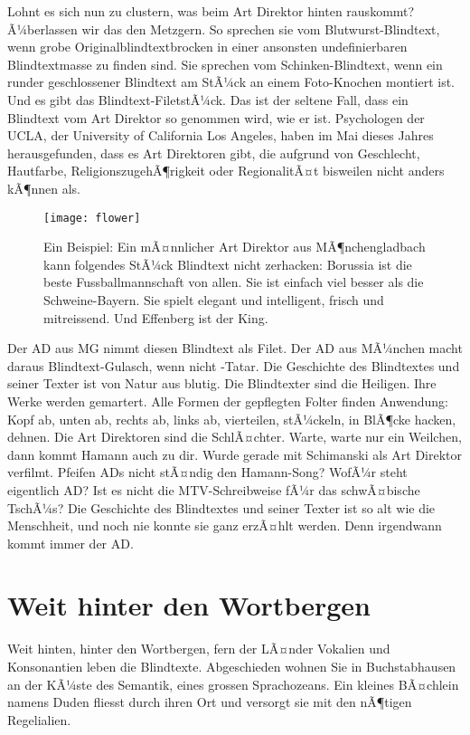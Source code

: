 \documentclass{scrartcl}
\begin{document}
  Lohnt es sich nun zu clustern, was beim Art Direktor hinten rauskommt? Ã¼berlassen wir das den Metzgern. So sprechen sie vom Blutwurst-Blindtext, wenn grobe Originalblindtextbrocken in einer ansonsten undefinierbaren Blindtextmasse zu finden sind. Sie sprechen vom Schinken-Blindtext, wenn ein runder geschlossener Blindtext am StÃ¼ck an einem Foto-Knochen montiert ist. Und es gibt das Blindtext-FiletstÃ¼ck. Das ist der seltene Fall, dass ein Blindtext vom Art Direktor so genommen wird, wie er ist. Psychologen der UCLA, der University of California Los Angeles, haben im Mai dieses Jahres herausgefunden, dass es Art Direktoren gibt, die aufgrund von Geschlecht, Hautfarbe, ReligionszugehÃ¶rigkeit oder RegionalitÃ¤t bisweilen nicht anders kÃ¶nnen als.

  \begin{figure}
    \centering
    \texttt{[image: flower]}
    \caption{Ein Beispiel: Ein mÃ¤nnlicher Art Direktor aus MÃ¶nchengladbach kann folgendes StÃ¼ck Blindtext nicht zerhacken: Borussia ist die beste Fussballmannschaft von allen. Sie ist einfach viel besser als die Schweine-Bayern. Sie spielt elegant und intelligent, frisch und mitreissend. Und Effenberg ist der King.}
    \label{fig:flower}
  \end{figure}

  Der AD aus MG nimmt diesen Blindtext als Filet. Der AD aus MÃ¼nchen macht daraus Blindtext-Gulasch, wenn nicht -Tatar. Die Geschichte des Blindtextes und seiner Texter ist von Natur aus blutig. Die Blindtexter sind die Heiligen. Ihre Werke werden gemartert. Alle Formen der gepflegten Folter finden Anwendung: Kopf ab, unten ab, rechts ab, links ab, vierteilen, stÃ¼ckeln, in BlÃ¶cke hacken, dehnen. Die Art Direktoren sind die SchlÃ¤chter. Warte, warte nur ein Weilchen, dann kommt Hamann auch zu dir. Wurde gerade mit Schimanski als Art Direktor verfilmt. Pfeifen ADs nicht stÃ¤ndig den Hamann-Song? WofÃ¼r steht eigentlich AD? Ist es nicht die MTV-Schreibweise fÃ¼r das schwÃ¤bische TschÃ¼s? Die Geschichte des Blindtextes und seiner Texter ist so alt wie die Menschheit, und noch nie konnte sie ganz erzÃ¤hlt werden. Denn irgendwann kommt immer der AD.

  \section{Weit hinter den Wortbergen}

  Weit hinten, hinter den Wortbergen, fern der LÃ¤nder Vokalien und Konsonantien leben die Blindtexte. Abgeschieden wohnen Sie in Buchstabhausen an der KÃ¼ste des Semantik, eines grossen Sprachozeans. Ein kleines BÃ¤chlein namens Duden fliesst durch ihren Ort und versorgt sie mit den nÃ¶tigen Regelialien.
\end{document}
